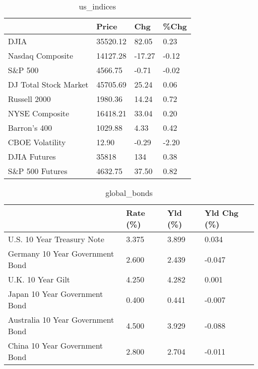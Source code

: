 \documentclass{article}%
\begin{document}
%


\begin{table}[htbp]%
\caption{us\_indices}%
\centering%
\begin{adjustbox}{width=1\textwidth}%
\begin{tabular}{llll}
\toprule
                      &    Price &    Chg &  \%Chg \\
\midrule
                 DJIA & 35520.12 &  82.05 &  0.23 \\
     Nasdaq Composite & 14127.28 & -17.27 & -0.12 \\
              S\&P 500 &  4566.75 &  -0.71 & -0.02 \\
DJ Total Stock Market & 45705.69 &  25.24 &  0.06 \\
         Russell 2000 &  1980.36 &  14.24 &  0.72 \\
       NYSE Composite & 16418.21 &  33.04 &  0.20 \\
         Barron's 400 &  1029.88 &   4.33 &  0.42 \\
      CBOE Volatility &    12.90 &  -0.29 & -2.20 \\
         DJIA Futures &    35818 &    134 &  0.38 \\
      S\&P 500 Futures &  4632.75 &  37.50 &  0.82 \\
\bottomrule
\end{tabular}
%
\end{adjustbox}%
\end{table}

%


\begin{table}[htbp]%
\caption{global\_bonds}%
\centering%
\begin{adjustbox}{width=1\textwidth}%
\begin{tabular}{llll}
\toprule
                                  & Rate (\%) & Yld (\%) & Yld Chg (\%) \\
\midrule
       U.S. 10 Year Treasury Note &    3.375 &   3.899 &       0.034 \\
  Germany 10 Year Government Bond &    2.600 &   2.439 &      -0.047 \\
                U.K. 10 Year Gilt &    4.250 &   4.282 &       0.001 \\
    Japan 10 Year Government Bond &    0.400 &   0.441 &      -0.007 \\
Australia 10 Year Government Bond &    4.500 &   3.929 &      -0.088 \\
    China 10 Year Government Bond &    2.800 &   2.704 &      -0.011 \\
\bottomrule
\end{tabular}
%
\end{adjustbox}%
\end{table}
\end{document}
